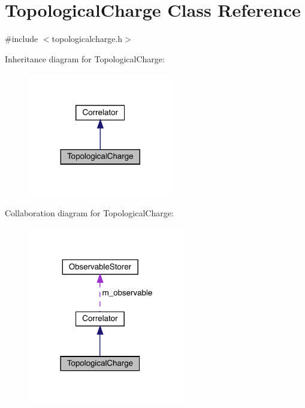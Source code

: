 \hypertarget{class_topological_charge}{}\section{Topological\+Charge Class Reference}
\label{class_topological_charge}


{\ttfamily \#include $<$topologicalcharge.\+h$>$}



Inheritance diagram for Topological\+Charge\+:\nopagebreak
\begin{figure}[H]
\begin{center}
\leavevmode
\includegraphics[width=179pt]{class_topological_charge__inherit__graph}
\end{center}
\end{figure}


Collaboration diagram for Topological\+Charge\+:\nopagebreak
\begin{figure}[H]
\begin{center}
\leavevmode
\includegraphics[width=195pt]{class_topological_charge__coll__graph}
\end{center}
\end{figure}
